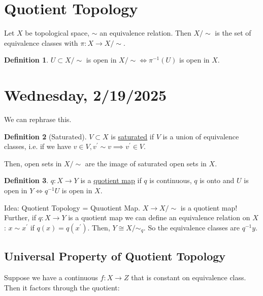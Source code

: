 \documentclass{article}
\theoremstyle{definition}
\newtheorem*{definition}{Definition}
\begin{document}
    \section*{Quotient Topology}

    Let \(X\) be topological space, \(\sim\) an equivalence relation. Then \(X / \sim\) is the set of equivalence classes with \(\pi: X \to X / \sim\).

    \begin{definition}
        \(U \subset X / \sim\) is open in \( X / \sim \iff \pi ^{-1} (U)\) is open in \(X\).
    \end{definition}

    \section*{Wednesday, 2/19/2025}
    
    We can rephrase this.

    \begin{definition}
        [Saturated] \(V \subset X\) is \underline{saturated} if \(V\) is a union of equivalence classes, i.e. if we have \(v\in V, v^{\prime} \sim v \implies v^{\prime} \in V\).
    \end{definition}

    Then, open sets in \(X / \sim\) are the image of saturated open sets in \(X\).

    \begin{definition}
        \(q: X \to Y\) is a \underline{quotient map} if \(q\) is continuous, \(q\) is onto and \(U\) is open in \(Y \iff q ^{-1} U\) is open in \(X\).
    \end{definition}
    
    Idea: Quotient Topology = Quuotient Map. \(X \to X / \sim\) is a quotient map! Further, if \(q: X \to Y\) is a quotient map we can define an equivalence relation on \(X\): \(x \sim x^{\prime}\) if \(q(x)=q(x^{\prime})\). Then, \(Y \cong X / \sim_q\). So the equivalence classes are \(q ^{-1} y\).

    \subsection*{Universal Property of Quotient Topology}

    Suppose we have a continuous \(f: X \to Z\) that is constant on equivalence class. Then it factors through the quotient:

    \begin{center}
    \end{center}
\end{document}
